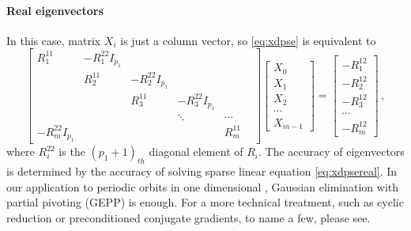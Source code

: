 \documentclass[final,leqno,onefignum,onetabnum]{siamltexmm}
\begin{document}
\paragraph{Real eigenvectors}
In this case, matrix $X_{i}$ is just a column vector, so
\eqref{eq:xdpse} is equivalent to
\begin{equation}
  \label{eq:xdpsereal}
  \begin{bmatrix}
    R^{11}_{1} & -R^{22}_{1}I_{p_{1}} &  & \\[1em]
    & R^{11}_{2} & -R^{22}_{2}I_{p_{1}} &  &\\[1em]
    &  & R^{11}_{3} & -R^{22}_{3}I_{p_{1}} &  &\\[1em]
    & & & \ddots &\cdots & \\[1em]
    -R^{22}_{m}I_{p_{1}} & & & & R^{11}_{m}
  \end{bmatrix}
  \begin{bmatrix}
    X_{0} \\[1em]
    X_{1}  \\[1em]
    X_{2}  \\[1em]
    \cdots \\[1em]
    X_{m-1}
  \end{bmatrix}
  =
  \begin{bmatrix}
    -R^{12}_{1} \\[1em]
    -R^{12}_{2} \\[1em]
    -R^{12}_{3} \\[1em]
    \cdots \\[1em]
    -R^{12}_{m}
  \end{bmatrix}
\,,
\end{equation}
where $R^{22}_{i}$ is the $(p_{1}+1)_{th}$ diagonal element of $R_{i}$.
The accuracy of eigenvectors is determined by the accuracy of
solving sparse linear equation \eqref{eq:xdpsereal}. In our application
to periodic orbits in one dimensional \KSe,
Gaussian  elimination with partial pivoting (GEPP) is enough. For a more
technical treatment, such as cyclic reduction or preconditioned conjugate
gradients, to name a few, please see.
\end{document}

